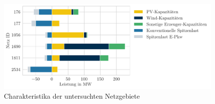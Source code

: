 \begin{figure}[H]
    \centering
    \includegraphics[width=\textwidth]{Bilder/Installed_cap_peak_load_representatives}
    \caption{Charakteristika der untersuchten Netzgebiete}\label{fig:bar_representatives}
\end{figure}